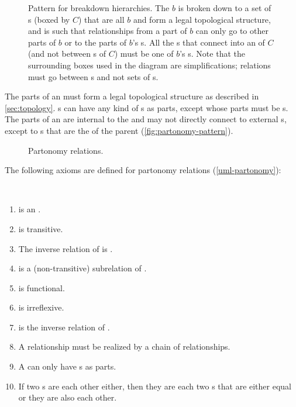 \begin{figure}
  \caption{Pattern for breakdown hierarchies. The  $b$ is
    broken down to a set of s (boxed by $C$) that are all
     $b$ and form a legal topological structure, and is
    such that  relationships from a part of
    $b$ can only go to other parts of $b$ or to the parts of $b$'s
    s. All the s that connect into an
     of $C$ (and not between s of $C$) must be
     one of $b$'s s.
    Note that the surrounding boxes used in the diagram are
    simplifications; relations must go between s and not
    sets of s. }
  \label{fig:partonomy-pattern}
\end{figure}


The parts of an  must form a legal topological structure
as described in \autoref{sec:topology}. s can have any
kind of s as parts, except  whose parts must
be s. The parts of an  are internal to the
 and may not directly connect to external s,
except to s that are  the  of the
parent  (\autoref{fig:partonomy-pattern}).


\begin{figure}
\centering

\caption{\label{uml-partonomy}
Partonomy relations.}
\end{figure}

The following axioms are defined for partonomy relations (\autoref{uml-partonomy}):
\begin{axioms}~
  \begin{enumerate}[resume=axioms,{label=(\arabic*)}]
  \item {} is an .
  \item {} is transitive.
  \item The inverse relation of  is . 
  \item {} is a (non-transitive) subrelation of . 
  \item {} is functional.
  \item {} is irreflexive.
  \item {} is the inverse relation of .
  \item A  relationship must be realized by a chain of  relationships.
  \item A  can only have s as parts. 
  \item If two s are  each other either,
    then they are each  two s that are
    either equal or they are also  each other.
  \end{enumerate}
\end{axioms}


